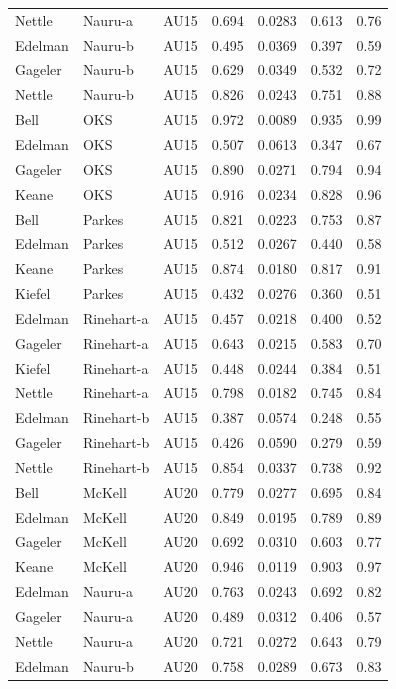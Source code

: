 \documentclass{monashthesis}
\begin{document}
\begin{center}
\begin{longtable}{lllllll}
Nettle & Nauru-a & AU15 & 0.694 & 0.0283 & 0.613 & 0.76 \\
Edelman & Nauru-b & AU15 & 0.495 & 0.0369 & 0.397 & 0.59 \\
Gageler & Nauru-b & AU15 & 0.629 & 0.0349 & 0.532 & 0.72 \\
Nettle & Nauru-b & AU15 & 0.826 & 0.0243 & 0.751 & 0.88 \\
Bell & OKS & AU15 & 0.972 & 0.0089 & 0.935 & 0.99 \\
Edelman & OKS & AU15 & 0.507 & 0.0613 & 0.347 & 0.67 \\
Gageler & OKS & AU15 & 0.890 & 0.0271 & 0.794 & 0.94 \\
Keane & OKS & AU15 & 0.916 & 0.0234 & 0.828 & 0.96 \\
Bell & Parkes & AU15 & 0.821 & 0.0223 & 0.753 & 0.87 \\
Edelman & Parkes & AU15 & 0.512 & 0.0267 & 0.440 & 0.58 \\
Keane & Parkes & AU15 & 0.874 & 0.0180 & 0.817 & 0.91 \\
Kiefel & Parkes & AU15 & 0.432 & 0.0276 & 0.360 & 0.51 \\
Edelman & Rinehart-a & AU15 & 0.457 & 0.0218 & 0.400 & 0.52 \\
Gageler & Rinehart-a & AU15 & 0.643 & 0.0215 & 0.583 & 0.70 \\
Kiefel & Rinehart-a & AU15 & 0.448 & 0.0244 & 0.384 & 0.51 \\
Nettle & Rinehart-a & AU15 & 0.798 & 0.0182 & 0.745 & 0.84 \\
Edelman & Rinehart-b & AU15 & 0.387 & 0.0574 & 0.248 & 0.55 \\
Gageler & Rinehart-b & AU15 & 0.426 & 0.0590 & 0.279 & 0.59 \\
Nettle & Rinehart-b & AU15 & 0.854 & 0.0337 & 0.738 & 0.92 \\
Bell & McKell & AU20 & 0.779 & 0.0277 & 0.695 & 0.84 \\
Edelman & McKell & AU20 & 0.849 & 0.0195 & 0.789 & 0.89 \\
Gageler & McKell & AU20 & 0.692 & 0.0310 & 0.603 & 0.77 \\
Keane & McKell & AU20 & 0.946 & 0.0119 & 0.903 & 0.97 \\
Edelman & Nauru-a & AU20 & 0.763 & 0.0243 & 0.692 & 0.82 \\
Gageler & Nauru-a & AU20 & 0.489 & 0.0312 & 0.406 & 0.57 \\
Nettle & Nauru-a & AU20 & 0.721 & 0.0272 & 0.643 & 0.79 \\
Edelman & Nauru-b & AU20 & 0.758 & 0.0289 & 0.673 & 0.83 \\

\end{longtable}
\end{center}
\end{document}
